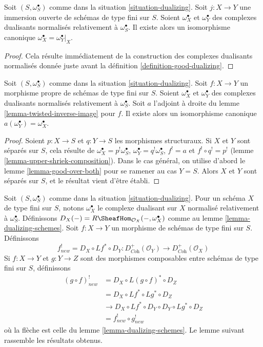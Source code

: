 \begin{lemma}
\label{lemma-open-immersion-good-dualizing-complex}
Soit $(S, \omega_S^\bullet)$ comme dans la situation \ref{situation-dualizing}. Soit $j : X \to Y$ une immersion ouverte de schémas de type fini sur $S$. Soient $\omega_X^\bullet$ et $\omega_Y^\bullet$ des complexes dualisants normalisés relativement à $\omega_S^\bullet$. Il existe alors un isomorphisme canonique $\omega_X^\bullet = \omega_Y^\bullet|_X$.
\end{lemma}

\begin{proof}
Cela résulte immédiatement de la construction des complexes dualisants normalisés donnée juste avant la définition \ref{definition-good-dualizing}.
\end{proof}

\begin{lemma}
\label{lemma-proper-map-good-dualizing-complex}
Soit $(S, \omega_S^\bullet)$ comme dans la situation \ref{situation-dualizing}. Soit $f : X \to Y$ un morphisme propre de schémas de type fini sur $S$. Soient $\omega_X^\bullet$ et $\omega_Y^\bullet$ des complexes dualisants normalisés relativement à $\omega_S^\bullet$. Soit $a$ l'adjoint à droite du lemme \ref{lemma-twisted-inverse-image} pour $f$. Il existe alors un isomorphisme canonique $a(\omega_Y^\bullet) = \omega_X^\bullet$.
\end{lemma}

\begin{proof}
Soient $p : X \to S$ et $q : Y \to S$ les morphismes structuraux. Si $X$ et $Y$ sont séparés sur $S$, cela résulte de $\omega_X^\bullet = p^!\omega_S^\bullet$, $\omega_Y^\bullet = q^!\omega_S^\bullet$, $f^! = a$ et $f^! \circ q^! = p^!$ (lemme \ref{lemma-upper-shriek-composition}). Dans le cas général, on utilise d'abord le lemme \ref{lemma-good-over-both} pour se ramener au cas $Y = S$. Alors $X$ et $Y$ sont séparés sur $S$, et le résultat vient d'être établi.
\end{proof}

\noindent
Soit $(S, \omega_S^\bullet)$ comme dans la situation \ref{situation-dualizing}. Pour un schéma $X$ de type fini sur $S$, notons $\omega_X^\bullet$ le complexe dualisant sur $X$ normalisé relativement à $\omega_S^\bullet$. Définissons $D_X(-) = R\SheafHom_{\mathcal{O}_X}(-, \omega_X^\bullet)$ comme au lemme \ref{lemma-dualizing-schemes}. Soit $f : X \to Y$ un morphisme de schémas de type fini sur $S$. Définissons
$$
f_{new}^! = D_X \circ Lf^* \circ D_Y :
D_{\textit{Coh}}^+(\mathcal{O}_Y)
\to
D_{\textit{Coh}}^+(\mathcal{O}_X)
$$
Si $f : X \to Y$ et $g : Y \to Z$ sont des morphismes composables entre schémas de type fini sur $S$, définissons
\begin{align*}
(g \circ f)^!_{new} & = D_X \circ L(g \circ f)^* \circ D_Z \\
& = D_X \circ Lf^* \circ Lg^* \circ D_Z \\
& \to D_X \circ Lf^* \circ D_Y \circ D_Y \circ Lg^* \circ D_Z \\
& = f^!_{new} \circ g^!_{new}
\end{align*}
où la flèche est celle du lemme \ref{lemma-dualizing-schemes}. Le lemme suivant rassemble les résultats obtenus.

